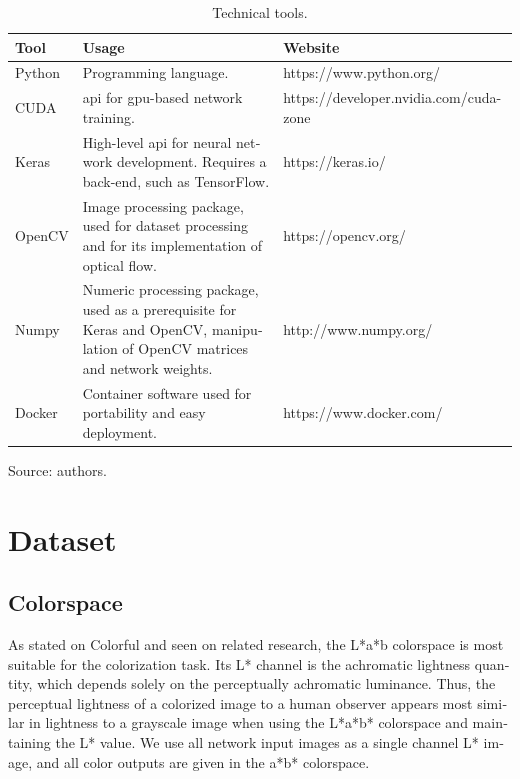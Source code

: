 \documentclass[12pt,openright,oneside,a4paper,english, brazilian]{abntex2}
\begin{document}
\begin{otherlanguage}{english}
\begin{table}[H]
    \centering
    \caption{Technical tools.}
    \begin{tabular}{l|l|l|l}
    Tool            & \multicolumn{2}{l|}{Usage}                 & Website             \\ \hline
    Python          & \multicolumn{2}{p{6cm}|}{Programming language.} & https://www.python.org/ \\ \hline
    CUDA            & \multicolumn{2}{p{6cm}|}{\acrshort{api} for \acrshort{gpu}-based network training.}  & https://developer.nvidia.com/cuda-zone \\ \hline
    Keras           & \multicolumn{2}{p{6cm}|}{High-level \acrshort{api} for neural network development. Requires a back-end, such as TensorFlow.}  & https://keras.io/   \\ \hline
    OpenCV          & \multicolumn{2}{p{6cm}|}{Image processing package, used for dataset processing and for its implementation of optical flow.}  & https://opencv.org/ \\ \hline
    Numpy           & \multicolumn{2}{p{6cm}|}{Numeric processing package, used as a prerequisite for Keras and OpenCV, manipulation of OpenCV matrices and network weights.}  & http://www.numpy.org/ \\ \hline
    Docker          &  \multicolumn{2}{p{6cm}|}{Container software used for portability and easy deployment.}  & https://www.docker.com/ \\ \hline
    \end{tabular}
    Source: authors.
    \label{table:tools}
\end{table}

\section{Dataset}
\subsection{Colorspace}
As stated on Colorful \cite{colorful} and seen on related research, the L*a*b colorspace is most suitable for the colorization task. Its L* channel is the achromatic lightness quantity, which depends solely on the perceptually achromatic luminance. Thus, the perceptual lightness of a colorized image to a human observer appears most similar in lightness to a grayscale image when using the L*a*b* colorspace and maintaining the L* value. We use all network input images as a single channel L* image, and all color outputs are given in the a*b* colorspace.


\end{otherlanguage}
\end{document}
